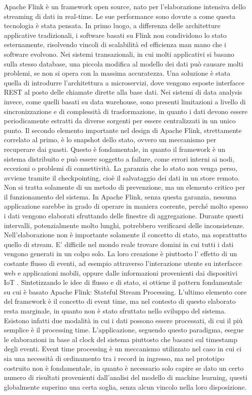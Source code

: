 Apache Flink è un framework open source, nato per l'elaborazione intensiva dello streaming di dati in real-time. Le sue performance sono dovute a come questa tecnologia è stata pensata. In primo luogo, a differenza delle architetture applicative tradizionali, i software basati su Flink non condividono lo stato esternamente, risolvendo vincoli di scalabilità ed efficienza man mano che i software evolvono. Nei sistemi transazionali, in cui molti applicativi si basano sulla stesso database, una piccola modifica al modello dei dati può causare molti problemi, se non si opera con la massima accuratezza. Una soluzione è stata quella di introdurre l'architettura a microservizi, dove vengono esposte interfacce REST al posto delle chiamate dirette alla base dati. Nei sistemi di data analysis invece, come quelli basati su data warehouse, sono presenti limitazioni a livello di sincronizzazione e di complessità di trasformazione, in quanto i dati devono essere periodicamente estratti da diverse sorgenti per essere centralizzati in un unico punto. Il secondo elemento importante nel design di Apache Flink, strettamente correlato al primo, è lo snapshot dello stato, ovvero un meccanismo per recuperare dai guasti. Questo è fondamentale, in quanto il framework è un sistema distribuito e può essere soggetto a failure, come errori interni ai nodi, eccezioni o problemi di connettività. La garanzia che lo stato non venga perso, avviene tramite il checkpointing, cioè il salvataggio dei dati in un store remoto. Non si tratta solamente di un metodo di prevenzione, ma un elemento critico per il funzionamento del sistema. In Apache Flink, senza questa garanzia, nessuna applicazione sarebbe in grado di operare in maniera coerente, perché molto spesso i dati vengono elaborati sfruttando delle finestre di aggregazione. Durante questi intervalli, potenzialmente molto lunghi, potrebbero verificarsi delle inconsistenze. Nell'elaborazione non è importante solamente il concetto di stato, ma soprattutto quello di stream. E' difficile nel mondo reale trovare domini in cui tutti i dati vengono generati in un colpo solo. La loro creazione è piuttosto l' effetto di un costante flusso di eventi, ad esempio attraverso l'interazione utente su interfacce web e applicazioni mobili, oppure dalle informazioni provenienti dai dispositivi IoT \cite{b14Flink}.
Sintetizzando le idee di flusso e di stato, si ottiene il pattern fondamentale su cui è basato Apache Flink: Stateful Stream Processing. L'ultimo elemento core del framework è il concetto di event time, ma nel contesto di questo elaborato resta marginale, in quanto non è stato sfruttato nello sviluppo del sistema. %
Esistono infatti due modalità in cui i dati possono essere processati, di cui il più semplice è il processing time. L'applicazione, seguendo questo paradigma, esegue le elaborazioni in base al clock del sistema piuttosto che basarsi sul timestamp degli eventi. Event time processing è un meccanismo utilizzato nel caso in cui ci sia una necessità di ordinamento tra i record in ingresso, ma nel prototipo costruito non è fondamentale, in quanto è necessario solo capire se dato un certo numero di risultati provenienti dall'analisi del modello di machine learning, questi globalmente superino una certa soglia, senza alcun vincolo nella loro disposizione.

